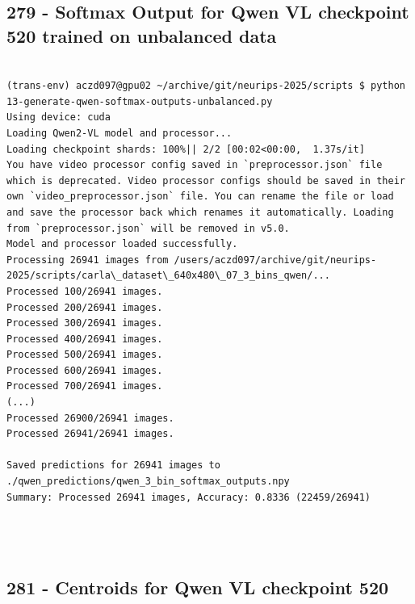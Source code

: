 \subsection{279 - Softmax Output for Qwen VL checkpoint 520 trained on unbalanced data}
\label{app_res:279}

\begin{verbatim}

(trans-env) aczd097@gpu02 ~/archive/git/neurips-2025/scripts $ python 13-generate-qwen-softmax-outputs-unbalanced.py 
Using device: cuda
Loading Qwen2-VL model and processor...
Loading checkpoint shards: 100%|| 2/2 [00:02<00:00,  1.37s/it]
You have video processor config saved in `preprocessor.json` file which is deprecated. Video processor configs should be saved in their own `video_preprocessor.json` file. You can rename the file or load and save the processor back which renames it automatically. Loading from `preprocessor.json` will be removed in v5.0.
Model and processor loaded successfully.
Processing 26941 images from /users/aczd097/archive/git/neurips-2025/scripts/carla\_dataset\_640x480\_07_3_bins_qwen/...
Processed 100/26941 images.
Processed 200/26941 images.
Processed 300/26941 images.
Processed 400/26941 images.
Processed 500/26941 images.
Processed 600/26941 images.
Processed 700/26941 images.
(...)
Processed 26900/26941 images.
Processed 26941/26941 images.

Saved predictions for 26941 images to ./qwen_predictions/qwen_3_bin_softmax_outputs.npy
Summary: Processed 26941 images, Accuracy: 0.8336 (22459/26941)


    
\end{verbatim}

\subsection{281 - Centroids for Qwen VL checkpoint 520}
\label{app_res:281}


